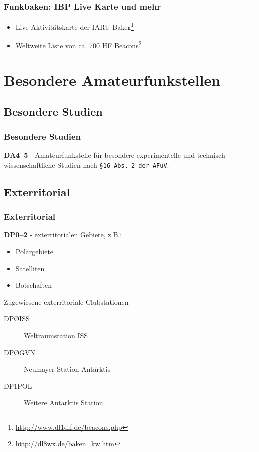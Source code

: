 \begin{frame}
  \frametitle{Funkbaken: IBP Live Karte und mehr}

  \begin{itemize}
    \item Live-Aktivitätskarte der IARU-Baken\footnote{\ExternalLink\url{http://www.dl1dlf.de/beacons.php}}
    \item Weltweite Liste von ca. 700 HF Beacons\footnote{\ExternalLink\url{http://dl8wx.de/baken_kw.htm}}
  \end{itemize}

\end{frame}

\section{Besondere Amateurfunkstellen}

\subsection{Besondere Studien}

\begin{frame}
  \frametitle{Besondere Studien}

  \textbf{DA4--5} - Amateurfunkstelle für besondere experimentelle und
  technisch-wissenschaftliche Studien nach \texttt{§16 Abs. 2 der AFuV}.

\end{frame}

\subsection{Exterritorial}

\begin{frame}
  \frametitle{Exterritorial}

  \textbf{DP0--2} - exterritorialen Gebiete, z.B.:

  \begin{itemize}
    \item Polargebiete
    \item Satelliten
    \item Botschaften
  \end{itemize}

  \begin{exampleblock}{Zugewiesene exterritoriale Clubstationen}
    \begin{description}
      \item[DPØISS] Weltraumstation ISS
      \item[DPØGVN] Neumayer-Station Antarktis
      \item[DP1POL] Weitere Antarktis Station
    \end{description}
  \end{exampleblock}

\end{frame}

